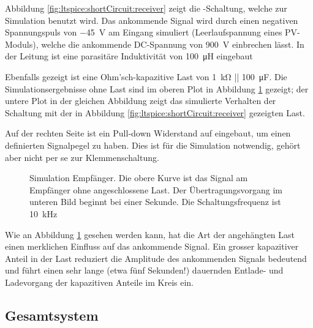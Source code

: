 Abbildung \ref{fig:ltspice:shortCircuit:receiver} zeigt die -Schaltung,
welche zur Simulation benutzt wird.
Das ankommende  Signal  wird  durch   einen  negativen  Spannungspuls  von
\SI{-45}{\volt}   am   Eingang   simuliert   (Leerlaufspannung   eines
PV-Moduls),  welche  die  ankommende DC-Spannung  von  \SI{900}{\volt}
einbrechen   l\"asst. In der Leitung ist eine parasit\"are Induktivit\"at
von \SI{100}{\micro\henry} eingebaut

Ebenfalls gezeigt  ist eine  Ohm'sch-kapazitive Last von  \SI{1}{\kilo\ohm} ||
\SI{100}{\micro\farad}. Die  Simulationsergebnisse ohne  Last  sind im  oberen
Plot in  Abbildung \ref{fig:simu:short:recv} gezeigt;  der untere Plot  in der
gleichen Abbildung  zeigt das  simulierte Verhalten der  Schaltung mit  der in
Abbildung \ref{fig:ltspice:shortCircuit:receiver} gezeigten Last.

Auf  der  rechten  Seite  ist   ein  Pull-down  Widerstand  auf  
eingebaut,  um einen  definierten  Signalpegel zu  haben. Dies  ist f\"ur  die
Simulation notwendig, geh\"ort aber nicht per se zur Klemmenschaltung.

\clearpage
\begin{figure}[h!tb]
    \centering
    
    \caption[Simulationsergebnisse Klemmenschaltung]{%
        Simulation   Empf\"anger. Die   obere   Kurve  ist   das   Signal   am
        Empf\"anger  ohne  angeschlossene Last. Der  \"Ubertragungsvorgang  im
        unteren  Bild beginnt  bei einer  Sekunde. Die Schaltungsfrequenz  ist
        \SI{10}{\kilo\hertz}%
    }
    \label{fig:simu:short:recv}
\end{figure}

Wie  an  Abbildung  \ref{fig:simu:short:recv}  gesehen werden  kann,  hat  die
Art  der  angeh\"angten Last  einen  merklichen  Einfluss auf  das  ankommende
Signal. Ein grosser kapazitiver Anteil in der Last reduziert die Amplitude des
ankommenden  Signals  bedeutend und  f\"uhrt  einen  sehr lange  (etwa  f\"unf
Sekunden!) dauernden Entlade- und Ladevorgang der kapazitiven Anteile im Kreis
ein.


\clearpage
\subsection{Gesamtsystem}
\label{subsec:simu:ask:total}


